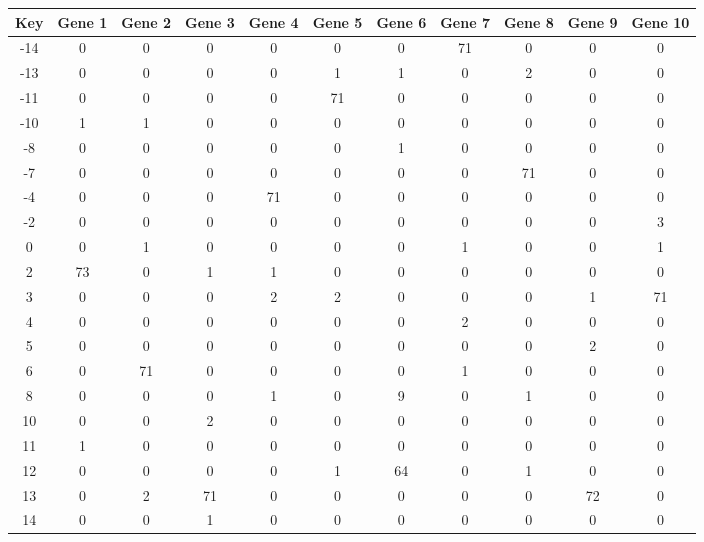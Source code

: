 \begin{tabular}{|c|c|c|c|c|c|c|c|c|c|c|}
\hline
Key & Gene 1 & Gene 2 & Gene 3 & Gene 4 & Gene 5 & Gene 6 & Gene 7 & Gene 8 & Gene 9 & Gene 10 \\
\hline
-14 & 0 & 0 & 0 & 0 & 0 & 0 & 71 & 0 & 0 & 0 \\
-13 & 0 & 0 & 0 & 0 & 1 & 1 & 0 & 2 & 0 & 0 \\
-11 & 0 & 0 & 0 & 0 & 71 & 0 & 0 & 0 & 0 & 0 \\
-10 & 1 & 1 & 0 & 0 & 0 & 0 & 0 & 0 & 0 & 0 \\
-8 & 0 & 0 & 0 & 0 & 0 & 1 & 0 & 0 & 0 & 0 \\
-7 & 0 & 0 & 0 & 0 & 0 & 0 & 0 & 71 & 0 & 0 \\
-4 & 0 & 0 & 0 & 71 & 0 & 0 & 0 & 0 & 0 & 0 \\
-2 & 0 & 0 & 0 & 0 & 0 & 0 & 0 & 0 & 0 & 3 \\
0 & 0 & 1 & 0 & 0 & 0 & 0 & 1 & 0 & 0 & 1 \\
2 & 73 & 0 & 1 & 1 & 0 & 0 & 0 & 0 & 0 & 0 \\
3 & 0 & 0 & 0 & 2 & 2 & 0 & 0 & 0 & 1 & 71 \\
4 & 0 & 0 & 0 & 0 & 0 & 0 & 2 & 0 & 0 & 0 \\
5 & 0 & 0 & 0 & 0 & 0 & 0 & 0 & 0 & 2 & 0 \\
6 & 0 & 71 & 0 & 0 & 0 & 0 & 1 & 0 & 0 & 0 \\
8 & 0 & 0 & 0 & 1 & 0 & 9 & 0 & 1 & 0 & 0 \\
10 & 0 & 0 & 2 & 0 & 0 & 0 & 0 & 0 & 0 & 0 \\
11 & 1 & 0 & 0 & 0 & 0 & 0 & 0 & 0 & 0 & 0 \\
12 & 0 & 0 & 0 & 0 & 1 & 64 & 0 & 1 & 0 & 0 \\
13 & 0 & 2 & 71 & 0 & 0 & 0 & 0 & 0 & 72 & 0 \\
14 & 0 & 0 & 1 & 0 & 0 & 0 & 0 & 0 & 0 & 0 \\
\hline
\end{tabular}